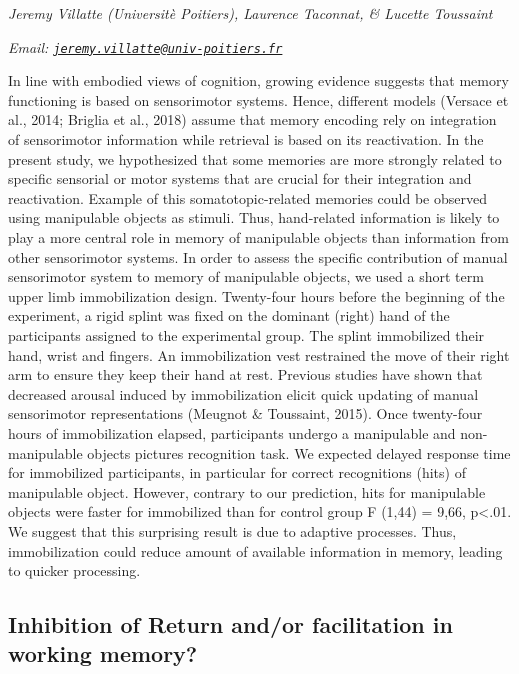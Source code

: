\documentclass[
  12pt,
]{book}
\begin{document}
\emph{Jeremy Villatte (Universitè Poitiers), Laurence Taconnat, \& Lucette Toussaint}

\emph{Email: \href{mailto:jeremy.villatte@univ-poitiers.fr}{\nolinkurl{jeremy.villatte@univ-poitiers.fr}}}

In line with embodied views of cognition, growing evidence suggests that memory functioning is based on sensorimotor systems. Hence, different models (Versace et al., 2014; Briglia et al., 2018) assume that memory encoding rely on integration of sensorimotor information while retrieval is based on its reactivation. In the present study, we hypothesized that some memories are more strongly related to specific sensorial or motor systems that are crucial for their integration and reactivation. Example of this somatotopic-related memories could be observed using manipulable objects as stimuli. Thus, hand-related information is likely to play a more central role in memory of manipulable objects than information from other sensorimotor systems. In order to assess the specific contribution of manual sensorimotor system to memory of manipulable objects, we used a short term upper limb immobilization design. Twenty-four hours before the beginning of the experiment, a rigid splint was fixed on the dominant (right) hand of the participants assigned to the experimental group. The splint immobilized their hand, wrist and fingers. An immobilization vest restrained the move of their right arm to ensure they keep their hand at rest. Previous studies have shown that decreased arousal induced by immobilization elicit quick updating of manual sensorimotor representations (Meugnot \& Toussaint, 2015). Once twenty-four hours of immobilization elapsed, participants undergo a manipulable and non-manipulable objects pictures recognition task. We expected delayed response time for immobilized participants, in particular for correct recognitions (hits) of manipulable object. However, contrary to our prediction, hits for manipulable objects were faster for immobilized than for control group F (1,44) = 9,66, p\textless.01. We suggest that this surprising result is due to adaptive processes. Thus, immobilization could reduce amount of available information in memory, leading to quicker processing.

\hypertarget{inhibition-of-return-andor-facilitation-in-working-memory}{%
\subsection{Inhibition of Return and/or facilitation in working memory?}\label{inhibition-of-return-andor-facilitation-in-working-memory}}
\end{document}
